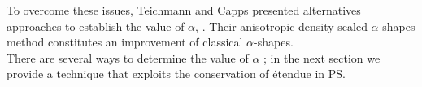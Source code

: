 To overcome these issues, Teichmann and Capps presented alternatives approaches to establish the value of $\alpha$, \cite{teichmann1998surface}. Their anisotropic density-scaled $\alpha$-shapes method constitutes an improvement of  classical $\alpha$-shapes.
\\ \indent There are several ways to determine the value of $\alpha$ \cite{mandal1997selection}; in the next section we provide a technique that exploits the conservation of \'{e}tendue in PS. 
